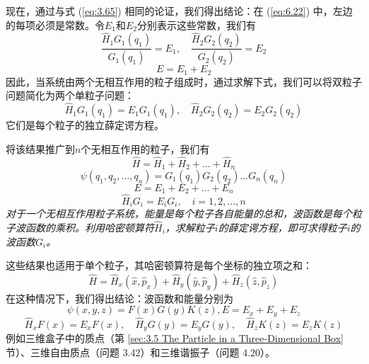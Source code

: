     现在，通过与式 (\ref{eq:3.65}) 相同的论证，我们得出结论：在 (\ref{eq:6.22}) 中，左边的每项必须是常数。令$E_1$和$E_2$分别表示这些常数，我们有
    \begin{equation*}
        \frac{\hat{H}_1G_1\left(q_1\right)}{G_1\left(q_1\right)} = E_1, \quad \frac{\hat{H}_2G_2\left(q_2\right)}{G_2\left(q_2\right)} = E_2
    \end{equation*}
    \begin{equation}
        E = E_1 + E_2
        \label{eq:6.23}
    \end{equation}
    因此，当系统由两个无相互作用的粒子组成时，通过求解下式，我们可以将双粒子问题简化为两个单粒子问题：
    \begin{equation}
        \hat{H}_1G_1\left(q_1\right) = E_1G_1\left(q_1\right), \quad \hat{H}_2G_2\left(q_2\right) = E_2G_2\left(q_2\right)
        \label{eq:6.24}
    \end{equation}
    它们是每个粒子的独立薛定谔方程。

    将该结果推广到$n$个无相互作用的粒子，我们有
    \begin{equation*}
        \hat{H} = \hat{H}_1 + \hat{H}_2 + \ldots + \hat{H}_n
    \end{equation*}
    \begin{equation}
        \boxed{
                \psi\left(q_1,q_2,\ldots,q_n\right) = G_1\left(q_1\right)G_2\left(q_2\right)\ldots G_n\left(q_n\right)
        }
        \label{eq:6.25}
    \end{equation}
    \begin{equation}
        \boxed{
            E = E_1 + E_2 + \ldots + E_n
        }
        \label{eq:6.26}
    \end{equation}
    \begin{equation}
        \boxed{
            \hat{H}_iG_i = E_iG_i, \quad i = 1, 2, \ldots, n
        }
        \label{eq:6.27}
    \end{equation}
    \textit{对于一个无相互作用粒子系统，能量是每个粒子各自能量的总和，波函数是每个粒子波函数的乘积。利用哈密顿算符$\hat{H}_i$，求解粒子$i$的薛定谔方程，即可求得粒子$i$的波函数$G_i$。}

    这些结果也适用于单个粒子，其哈密顿算符是每个坐标的独立项之和：
    \begin{equation*}
        \hat{H} = \hat{H}_x\left(\hat{x},\hat{p}_x\right) + \hat{H}_y\left(\hat{y},\hat{p}_y\right) + \hat{H}_z\left(\hat{z},\hat{p}_z\right)
    \end{equation*}
    在这种情况下，我们得出结论：波函数和能量分别为
    \begin{equation*}
        \psi\left(x,y,z\right) = F\left(x\right)G\left(y\right)K\left(z\right), E = E_x + E_y + E_z
    \end{equation*}
    \begin{equation*}
        \hat{H}_xF\left(x\right) = E_xF\left(x\right), \quad \hat{H}_yG\left(y\right) = E_yG\left(y\right), \quad \hat{H}_zK\left(z\right) = E_zK\left(z\right)
    \end{equation*}
    例如三维盒子中的质点（第 \ref{sec:3.5 The Particle in a Three-Dimensional Box} 节）、三维自由质点（问题 3.42）和三维谐振子（问题 4.20）。
